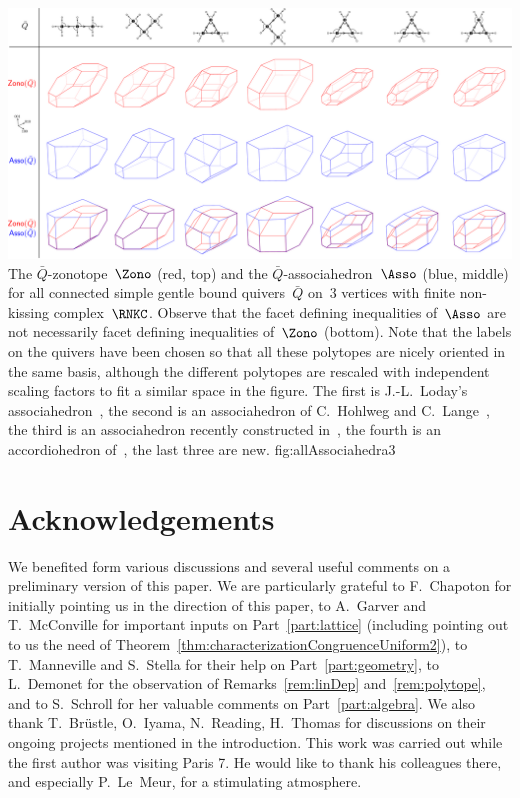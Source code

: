 \documentclass{amsart}
\theoremstyle{definition}
\begin{document}
\captionsetup{width=1.5\textwidth}
{\includegraphics[scale=.27]{allAssociahedra3}}
{The $\bar Q$-zonotope~$\Zono$ (red, top) and the $\bar Q$-associahedron~$\Asso$ (blue, middle) for all connected simple gentle bound quivers~$\bar Q$ on~$3$ vertices with finite non-kissing complex~$\RNKC$. Observe that the facet defining inequalities of~$\Asso$ are not necessarily facet defining inequalities of~$\Zono$ (bottom). Note that the labels on the quivers have been chosen so that all these polytopes are nicely oriented in the same basis, although the different polytopes are rescaled with independent scaling factors to fit a similar space in the figure. The first is J.-L.~Loday's associahedron~\cite{Loday}, the second is an associahedron of C.~Hohlweg and C.~Lange~\cite{HohlwegLange}, the third is an associahedron recently constructed in~\cite{HohlwegPilaudStella}, the fourth is an accordiohedron of~\cite{MannevillePilaud-accordion}, the last three are new.}
{fig:allAssociahedra3}
\captionsetup{width=\textwidth}




\section*{Acknowledgements}

We benefited form various discussions and several useful comments on a preliminary version of this paper.
We are particularly grateful to F.~Chapoton for initially pointing us in the direction of this paper, to A.~Garver and T.~McConville for important inputs on Part~\ref{part:lattice} (including pointing out to us the need of Theorem~\ref{thm:characterizationCongruenceUniform2}), to T.~Manneville and S.~Stella for their help on Part~\ref{part:geometry}, to L.~Demonet for the observation of Remarks~\ref{rem:linDep} and~\ref{rem:polytope}, and to S.~Schroll for her valuable comments on Part~\ref{part:algebra}.
We also thank T.~Br\"ustle, O.~Iyama, N.~Reading, H.~Thomas for discussions on their ongoing projects mentioned in the introduction.
This work was carried out while the first author was visiting Paris 7. He would like to thank his colleagues there, and especially \mbox{P.~Le Meur}, for a stimulating atmosphere.




\label{sec:biblio}
\end{document}

